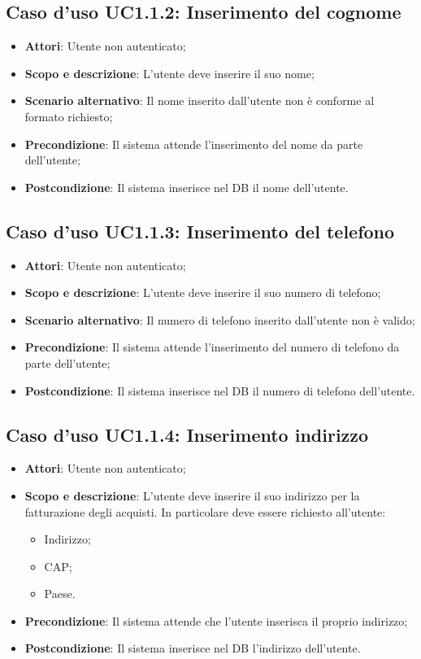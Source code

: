 \documentclass[12pt,a4paper,titlepage]{article}
\begin{document}
	\subsection{Caso d'uso UC1.1.2: Inserimento del cognome}
	\label{UC1.1.2}
	\begin{itemize}
		\item \textbf{Attori}: Utente non autenticato;
		\item \textbf{Scopo e descrizione}: L'utente deve inserire il suo nome;
		\item \textbf{Scenario alternativo}: Il nome inserito dall'utente non è conforme al formato richiesto;
		\item \textbf{Precondizione}: Il sistema attende l'inserimento del nome da parte dell'utente;
		\item \textbf{Postcondizione}: Il sistema inserisce nel DB il nome dell'utente.
	\end{itemize}
	\subsection{Caso d'uso UC1.1.3: Inserimento del telefono}
	\label{UC1.1.3}
	\begin{itemize}
		\item \textbf{Attori}: Utente non autenticato;
		\item \textbf{Scopo e descrizione}: L'utente deve inserire il suo numero di telefono;
		\item \textbf{Scenario alternativo}: Il numero di telefono inserito dall'utente non è valido;
		\item \textbf{Precondizione}: Il sistema attende l'inserimento del numero di telefono da parte dell'utente;
		\item \textbf{Postcondizione}: Il sistema inserisce nel DB il numero di telefono dell'utente.
	\end{itemize}
	\subsection{Caso d'uso UC1.1.4: Inserimento indirizzo}
	\label{UC1.1.4}
	\begin{itemize}
		\item \textbf{Attori}: Utente non autenticato;
		\item \textbf{Scopo e descrizione}: L'utente deve inserire il suo indirizzo per la fatturazione degli acquisti. In particolare deve essere richiesto all'utente:
		\begin{itemize}
			\item Indirizzo;
			\item CAP;
			\item Paese.
		\end{itemize}
		\item \textbf{Precondizione}: Il sistema attende che l'utente inserisca il proprio indirizzo;
		\item \textbf{Postcondizione}: Il sistema inserisce nel DB l'indirizzo dell'utente.
	\end{itemize}
\end{document}

